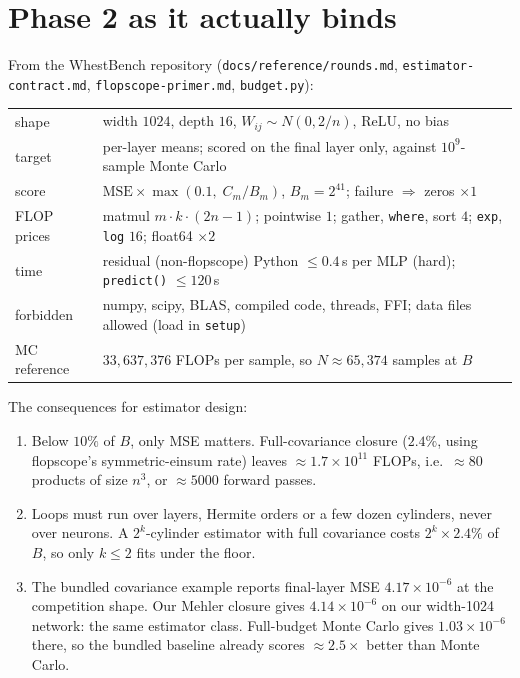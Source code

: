 \documentclass[11pt]{article}
\theoremstyle{definition}
\theoremstyle{remark}
\begin{document}
\section{Phase 2 as it actually binds}\label{sec:rules}

From the WhestBench repository (\texttt{docs/reference/rounds.md}, \texttt{estimator-contract.md}, \texttt{flopscope-primer.md}, \texttt{budget.py}):

\begin{center}\small
\begin{tabular}{@{}ll@{}}
\toprule
shape & width $1024$, depth $16$, $W_{ij}\sim N(0,2/n)$, ReLU, no bias\\
target & per-layer means; scored on the final layer only, against $10^9$-sample Monte Carlo\\
score & $\text{MSE}\times\max(0.1,\;C_m/B_m)$, $B_m=2^{41}$; failure $\Rightarrow$ zeros $\times1$\\
FLOP prices & matmul $m\cdot k\cdot(2n-1)$; pointwise $1$; gather, \texttt{where}, sort $4$; \texttt{exp}, \texttt{log} $16$; float64 $\times2$\\
time & residual (non-flopscope) Python $\le0.4$\,s per MLP (hard); \texttt{predict()} $\le120$\,s\\
forbidden & numpy, scipy, BLAS, compiled code, threads, FFI; data files allowed (load in \texttt{setup})\\
MC reference & $33{,}637{,}376$ FLOPs per sample, so $N\approx65{,}374$ samples at $B$\\
\bottomrule
\end{tabular}
\end{center}

\noindent The consequences for estimator design:
\begin{enumerate}
\item Below $10\%$ of $B$, only MSE matters. Full-covariance closure ($2.4\%$, using flopscope's symmetric-einsum rate) leaves $\approx1.7\times10^{11}$ FLOPs, i.e.\ $\approx80$ products of size $n^3$, or $\approx5000$ forward passes.
\item Loops must run over layers, Hermite orders or a few dozen cylinders, never over neurons. A $2^k$-cylinder estimator with full covariance costs $2^k\times2.4\%$ of $B$, so only $k\le2$ fits under the floor.
\item The bundled covariance example reports final-layer MSE $4.17\times10^{-6}$ at the competition shape. Our Mehler closure gives $4.14\times10^{-6}$ on our width-1024 network: the same estimator class. Full-budget Monte Carlo gives $1.03\times10^{-6}$ there, so the bundled baseline already scores $\approx2.5\times$ better than Monte Carlo.
\end{enumerate}
\end{document}
